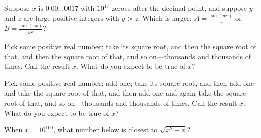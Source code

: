 \documentclass{ximera}
\begin{document}
\begin{shuffle}
\begin{problem}
  Suppose $x$ is $0.00\dots 0017$ with $10^{17}$ zeroes after the
  decimal point, and suppose $y$ and $z$ are large positive integers
  with $y > z$.  Which is larger: $A = \frac{\sin (yx)}{zx}$ or
  $B = \frac{\sin (zx)}{yx}$?
  \begin{multipleChoice}
  \end{multipleChoice}
\end{problem}

\begin{problem}
  Pick some positive real number; take its square root, and then the
  square root of that, and then the square root of that, and so
  on---thousands and thousands of times.  Call the result $x$.  What
  do you expect to be true of $x$?
  \begin{multipleChoice}
  \end{multipleChoice}
\end{problem}

\begin{problem}
  Pick some positive real number; add one; take its square root, and
  then add one and take the square root of that, and then add one and
  again take the square root of that, and so on---thousands and
  thousands of times.  Call the result $x$.  What do you expect to be
  true of $x$?
  \begin{multipleChoice}
  \end{multipleChoice}
\end{problem}





\begin{problem}
  When $x = 10^{100}$, what number below is closest to $\sqrt{x^2 + x}$?
  \begin{multipleChoice}
  \end{multipleChoice}
\end{problem}


\end{shuffle}
\end{document}
